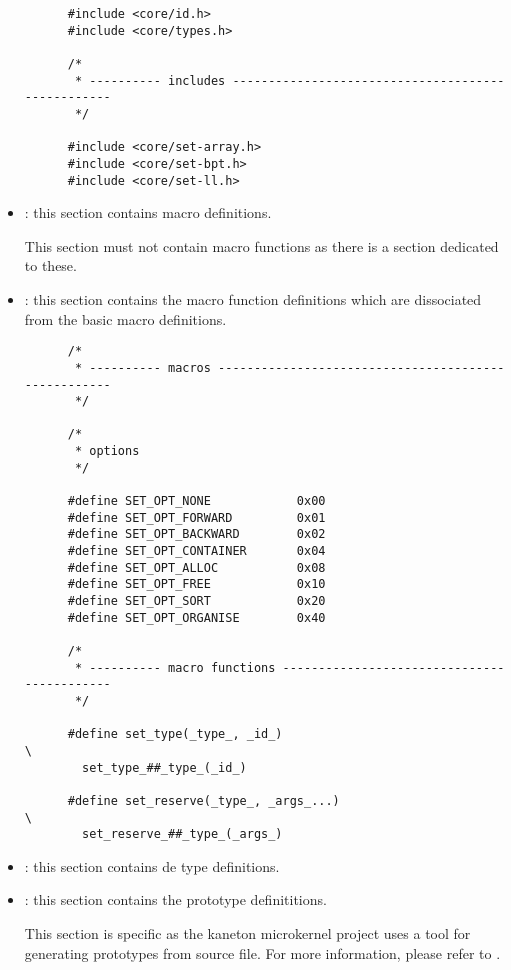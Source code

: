 \begin{itemize}
\begin{verbatim}
      #include <core/id.h>
      #include <core/types.h>

      /*
       * ---------- includes --------------------------------------------------
       */

      #include <core/set-array.h>
      #include <core/set-bpt.h>
      #include <core/set-ll.h>
    \end{verbatim}
  \item
    : this section contains macro definitions.

    \-

    This section must not contain macro functions as there is a section
    dedicated to these.
  \item
    : this section contains the macro function
    definitions which are dissociated from the basic macro definitions.

    \begin{verbatim}
      /*
       * ---------- macros ----------------------------------------------------
       */

      /*
       * options
       */

      #define SET_OPT_NONE            0x00
      #define SET_OPT_FORWARD         0x01
      #define SET_OPT_BACKWARD        0x02
      #define SET_OPT_CONTAINER       0x04
      #define SET_OPT_ALLOC           0x08
      #define SET_OPT_FREE            0x10
      #define SET_OPT_SORT            0x20
      #define SET_OPT_ORGANISE        0x40

      /*
       * ---------- macro functions -------------------------------------------
       */

      #define set_type(_type_, _id_)                                    \
        set_type_##_type_(_id_)

      #define set_reserve(_type_, _args_...)                            \
        set_reserve_##_type_(_args_)
    \end{verbatim}
  \item
    : this section contains de type definitions.
  \item
    \term{prototypes}: this section contains the prototype definititions.

    \-

    This section is specific as the kaneton microkernel project uses a
    tool for generating prototypes from  source file. For more
    information, please refer to .


\end{itemize}
